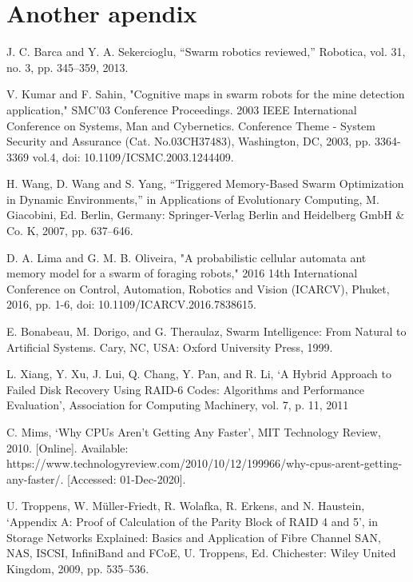 \documentclass{UoYCSproject}
\begin{document}
\chapter{Another apendix}


\begin{thebibliography}{100}
J. C. Barca and Y. A. Sekercioglu, “Swarm robotics reviewed,” Robotica, vol. 31, no. 3, pp. 345–359, 2013.

V. Kumar and F. Sahin, "Cognitive maps in swarm robots for the mine detection application," SMC'03 Conference Proceedings. 2003 IEEE International Conference on Systems, Man and Cybernetics. Conference Theme - System Security and Assurance (Cat. No.03CH37483), Washington, DC, 2003, pp. 3364-3369 vol.4, doi: 10.1109/ICSMC.2003.1244409.

H. Wang, D. Wang and S. Yang, “Triggered Memory-Based Swarm Optimization in Dynamic Environments,” in Applications of Evolutionary Computing, M. Giacobini, Ed. Berlin, Germany: Springer-Verlag Berlin and Heidelberg GmbH \& Co. K, 2007, pp. 637–646.

D. A. Lima and G. M. B. Oliveira, "A probabilistic cellular automata ant memory model for a swarm of foraging robots," 2016 14th International Conference on Control, Automation, Robotics and Vision (ICARCV), Phuket, 2016, pp. 1-6, doi: 10.1109/ICARCV.2016.7838615.

E. Bonabeau, M. Dorigo, and G. Theraulaz, Swarm Intelligence: From Natural to Artificial Systems. Cary, NC, USA: Oxford University Press, 1999.

L. Xiang, Y. Xu, J. Lui, Q. Chang, Y. Pan, and R. Li, ‘A Hybrid Approach to Failed Disk Recovery Using RAID-6 Codes: Algorithms and Performance Evaluation’, Association for Computing Machinery, vol. 7, p. 11, 2011

C. Mims, ‘Why CPUs Aren’t Getting Any Faster’, MIT Technology Review, 2010. [Online]. Available: https://www.technologyreview.com/2010/10/12/199966/why-cpus-arent-getting-any-faster/. [Accessed: 01-Dec-2020].

U. Troppens, W. Müller‐Friedt, R. Wolafka, R. Erkens, and N. Haustein, ‘Appendix A: Proof of Calculation of the Parity Block of RAID 4 and 5’, in Storage Networks Explained: Basics and Application of Fibre Channel SAN, NAS, ISCSI, InfiniBand and FCoE, U. Troppens, Ed. Chichester: Wiley United Kingdom, 2009, pp. 535–536.


\end{thebibliography}
\end{document}
